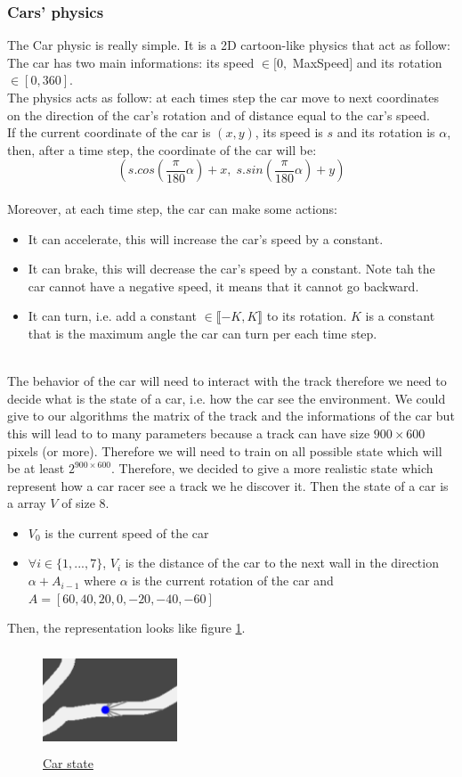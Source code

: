 \documentclass[11pt,a4paper]{article}
\newcounter{fig}
\newcommand{\tab}{\phantom{xxx}}
\newcommand{\mlist}[1]{\begin{itemize}[noitemsep,topsep=0pt]#1\end{itemize}}
\begin{document}
			\subsubsection*{Cars' physics}
The Car physic is really simple. It is a 2D cartoon-like physics that act as follow:\\
The car has two main informations: its speed $\in [0,$ MaxSpeed$]$ and its rotation $\in [0,360]$.\\
The physics acts as follow: at each times step the car move to next coordinates on the direction of the car's rotation and of distance equal to the car's speed.\\
If the current coordinate of the car is $(x,y)$, its speed is $s$ and its rotation is $\alpha$, then, after a time step, the coordinate of the car will be:
\[(s.cos(\frac{\pi}{180}\alpha) + x,\; s.sin(\frac{\pi}{180}\alpha) + y)\]
\\
Moreover, at each time step, the car can make some actions:
\mlist{
\item It can accelerate, this will increase the car's speed by a constant.
\item It can brake, this will decrease the car's speed by a constant. Note tah the car cannot have a negative speed, it means that it cannot go backward.
\item It can turn, i.e. add a constant $\in \llbracket-K,K\rrbracket$ to its rotation. $K$ is a constant that is the maximum angle the car can turn per each time step.
}
\tab \\
The behavior of the car will need to interact with the track therefore we need to decide what is the state of a car, i.e. how the car see the environment. We could give to our algorithms the matrix of the track and the informations of the car but this will lead to to many parameters because a track can have size $900\times600$ pixels (or more). Therefore we will need to train on all possible state which will be at least $2^{900\times 600}$. Therefore, we decided to give a more realistic state which represent how a car racer see a track we he discover it. Then the state of a car is a array $V$ of size $8$.
\mlist{
\item $V_0$ is the current speed of the car
\item $\forall i\in\{1,...,7\}$, $V_i$ is the distance of the car to the next wall in the direction $\alpha + A_{i-1}$ where $\alpha$ is the current rotation of the car and $A=[60, 40, 20, 0, -20, -40, -60]$
}
Then, the representation looks like figure \ref{figure:car state}.
\begin{center}
	\begin{figure}[ht]
		\centering
		\includegraphics[width=4cm, height=3cm]{car_state.png}
		\caption{\underline{Car state}}
		\label{figure:car state}
	\end{figure}
\end{center}
		
\end{document}
